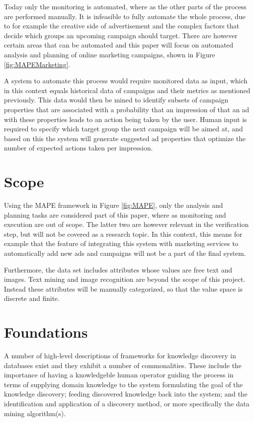 \documentclass[a4paper]{article}
\begin{document}
Today only the monitoring is automated, where as the other parts of the process are performed manually. It is infeasible to fully
automate the whole process, due to for example the creative side of advertisement and the complex factors that decide which groups
an upcoming campaign should target. There are however certain areas that can be automated and this paper will focus on automated
analysis and planning of online marketing campaigns, shown in Figure \ref{fig:MAPEMarketing}.

A system to automate this process would require monitored data as input, which in this context equals historical data of campaigns
and their metrics as mentioned previously. This data would then be mined to identify subsets of campaign properties that are
associated with a probability that an impression of that an ad with these properties leads to an action being taken by the user.
Human input is required to specify which target group the next campaign will be aimed at, and based on this the system will
generate suggested ad properties that optimize the number of expected actions taken per impression.

\section{Scope}
Using the MAPE framework in Figure \ref{fig:MAPE}, only the analysis and planning tasks are considered part of this paper, where
as monitoring and execution are out of scope. The latter two are however relevant in the verification step, but will not be
covered as a research topic. In this context, this means for example that the feature of integrating this system with marketing
services to automatically add new ads and campaigns will not be a part of the final system.

Furthermore, the data set includes attributes whose values are free text and images. Text mining and image recognition are beyond
the scope of this project. Instead these attributes will be manually categorized, so that the value space is discrete and finite.

\section{Foundations}
A number of high-level descriptions of frameworks for knowledge discovery in databases exist \citep{Fayyad1996, Frawley1992}
and they exhibit a number of commonalities. These include the importance of having a knowledgeble human operator guiding the
process in terms of supplying domain knowledge to the system formulating the goal of the knowledge discovery; feeding discovered
knowledge back into the system; and the identification and application of a discovery method, or more specifically the data mining
algorithm(s).
\end{document}
